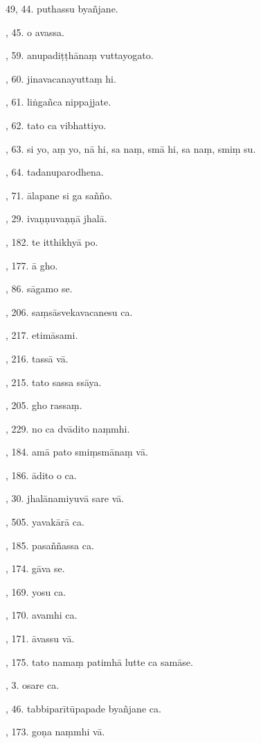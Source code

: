 49, 44. puthassu byañjane.\hfill \pageref{sut:49}\par {}, 45. o avassa.\hfill \pageref{sut:50}\par {}, 59. anupadiṭṭhānaṃ vuttayogato.\hfill \pageref{sut:51}\par {}, 60. jinavacanayuttaṃ hi.\par {}, 61. liṅgañca nippajjate.\par {}, 62. tato ca vibhattiyo.\par {}, 63. si yo, aṃ yo, nā hi, sa naṃ, smā hi, sa naṃ, smiṃ su.\par {}, 64. tadanuparodhena.\par {}, 71. ālapane si ga sañño.\par {}, 29. ivaṇṇuvaṇṇā jhalā.\par {}, 182. te itthikhyā po.\par {}, 177. ā gho.\par {}, 86. sāgamo se.\par {}, 206. saṃsāsvekavacanesu ca.\par {}, 217. etimāsami.\par {}, 216. tassā vā.\par {}, 215. tato sassa ssāya.\par {}, 205. gho rassaṃ.\par {}, 229. no ca dvādito naṃmhi.\par {}, 184. amā pato smiṃsmānaṃ vā.\par {}, 186. ādito o ca.\par {}, 30. jhalānamiyuvā sare vā.\par {}, 505. yavakārā ca.\par {}, 185. pasaññassa ca.\par {}, 174. gāva se.\par {}, 169. yosu ca.\par {}, 170. avamhi ca.\par {}, 171. āvassu vā.\par {}, 175. tato namaṃ patimhā lutte ca samāse.\par {}, 3. osare ca.\par {}, 46. tabbiparītūpapade byañjane ca.\par {}, 173. goṇa naṃmhi vā.\par \noindent
